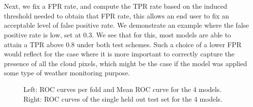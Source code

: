 \documentclass[11pt, letterpaper, journal]{IEEEtran}
\begin{document}
\\
\\
Next, we fix a FPR rate, and compute the TPR rate based on the induced threshold needed to obtain that FPR rate, this allows an end user to fix an acceptable level of false positive rate. We demonstrate an example where the false positive rate is low, set at 0.3. We see that for this, most models are able to attain a TPR above 0.8 under both test schemes. Such a choice of a lower FPR would reflect for the case where it is more important to correctly capture the presence of all the cloud pixels, which might be the case if the model was applied some type of weather monitoring purpose.

\begin{figure}%
    \centering
    \qquad
    \caption{Left: ROC curves per fold and Mean ROC curve for the 4 models. Right: ROC curves of the single held out test set for the 4 models. }%
    \label{fig:ROC_curves scheme1}%
\end{figure}
\end{document}
